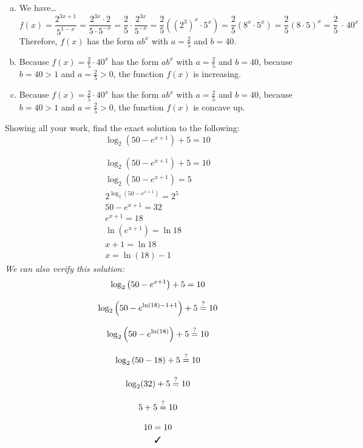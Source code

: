 \documentclass[12pt,letterpaper]{exam}
\begin{document}
\begin{questions}
{\itshape
\sol 
\begin{enumerate}[(a)]
\item We have\dots
	\[
	f(x)= \dfrac{2^{3x + 1}}{5^{1 - x}}= \dfrac{2^{3x} \cdot 2}{5 \cdot 5^{-x}}= \dfrac{2}{5} \cdot \dfrac{2^{3x}}{5^{-x}}= \dfrac{2}{5}  \left( (2^3)^x \cdot 5^x \right)= \dfrac{2}{5} \left( 8^x \cdot 5^x \right)= \dfrac{2}{5} \left(8 \cdot 5 \right)^x= \dfrac{2}{5}\, \cdot\, 40^x
	\]
Therefore, $f(x)$ has the form $ab^x$ with $a= \frac{2}{5}$ and $b= 40$. \pspace

\item Because $f(x)= \frac{2}{5} \cdot 40^x$ has the form $ab^x$ with $a= \frac{2}{5}$ and $b= 40$, because $b= 40 > 1$ and $a= \frac{2}{5} > 0$, the function $f(x)$ is increasing. \pspace

\item Because $f(x)= \frac{2}{5} \cdot 40^x$ has the form $ab^x$ with $a= \frac{2}{5}$ and $b= 40$, because $b= 40 > 1$ and $a= \frac{2}{5} > 0$, the function $f(x)$ is concave up.  
\end{enumerate}
}



\newpage
\question[10] Showing all your work, find the exact solution to the following:
	\[
	\log_2 \left( 50 - e^{x + 1} \right) + 5= 10
	\] \pspace

{\itshape
\sol 
	\[
	\begin{gathered}
	\log_2 \left( 50 - e^{x + 1} \right) + 5= 10 \\[0.3cm]
	\log_2 \left( 50 - e^{x + 1} \right)= 5 \\[0.3cm]
	2^{\log_2 \left( 50 - e^{x + 1} \right)}= 2^5 \\[0.3cm]
	50 - e^{x + 1}= 32 \\[0.3cm]
	e^{x + 1}= 18 \\[0.3cm]
	\ln \left( e^{x + 1} \right)= \ln 18 \\[0.3cm]
	x + 1= \ln 18 \\[0.3cm]
	x= \ln(18) - 1
	\end{gathered}
	\] \pspace
We can also verify this solution: 
	\[
	\begin{gathered}
	\log_2 \left( 50 - e^{x + 1} \right) + 5= 10 \\[0.3cm]
	\log_2 \left( 50 - e^{\ln(18) - 1 + 1} \right) + 5\stackrel{?}{=}10 \\[0.3cm]
	\log_2 \left( 50 - e^{\ln(18)} \right) + 5\stackrel{?}{=}10 \\[0.3cm]
	\log_2 \left( 50 - 18 \right) + 5\stackrel{?}{=}10 \\[0.3cm]
	\log_2(32) + 5 \stackrel{?}{=}10 \\[0.3cm]
	5 + 5\stackrel{?}{=}10 \\[0.3cm]
	10= 10 \\
	\text{\cmark}
	\end{gathered}
	\]
}




\end{questions}
\end{document}
